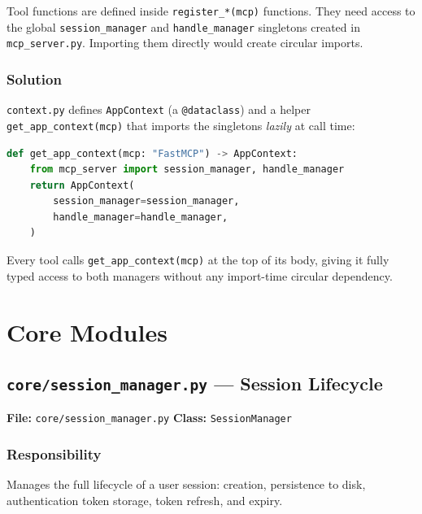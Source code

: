 \documentclass[12pt,a4paper]{report}
\begin{document}
Tool functions are defined inside \texttt{register\_*(mcp)} functions.
They need access to the global \texttt{session\_manager} and \texttt{handle\_manager}
singletons created in \texttt{mcp\_server.py}. Importing them directly would create
circular imports.

\subsection{Solution}

\texttt{context.py} defines \texttt{AppContext} (a \texttt{@dataclass}) and
a helper \texttt{get\_app\_context(mcp)} that imports the singletons \emph{lazily}
at call time:

\begin{lstlisting}[language=Python, caption={get\_app\_context helper}]
def get_app_context(mcp: "FastMCP") -> AppContext:
    from mcp_server import session_manager, handle_manager
    return AppContext(
        session_manager=session_manager,
        handle_manager=handle_manager,
    )
\end{lstlisting}

Every tool calls \texttt{get\_app\_context(mcp)} at the top of its body, giving it
fully typed access to both managers without any import-time circular dependency.

\chapter{Core Modules}

\section{\texttt{core/session\_manager.py} --- Session Lifecycle}

\begin{mdframed}[style=filebox]
\textbf{File:} \texttt{core/session\_manager.py} \quad
\textbf{Class:} \texttt{SessionManager}
\end{mdframed}

\subsection{Responsibility}

Manages the full lifecycle of a user session: creation, persistence to disk,
authentication token storage, token refresh, and expiry.
\end{document}

